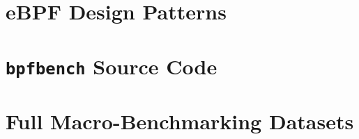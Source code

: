 \documentclass[
  12pt]{findlay}
\begin{document}
\clearpage
{}
\printbibliography
\clearpage

\appendix
\appendixpage

\hypertarget{ebpf-design-patterns}{%
\section{eBPF Design Patterns}\label{ebpf-design-patterns}}

\label{ebpf-design-patterns}


\FloatBarrier

\clearpage

\hypertarget{bpfbench-source-code}{%
\section{\texorpdfstring{\texttt{bpfbench} Source
Code}{bpfbench Source Code}}\label{bpfbench-source-code}}

\label{bpfbench}


\hypertarget{full-macro-benchmarking-datasets}{%
\section{Full Macro-Benchmarking
Datasets}\label{full-macro-benchmarking-datasets}}

\label{appendix_datasets}

\begingroup
\let\tablesize\scriptsize


\endgroup
\end{document}
